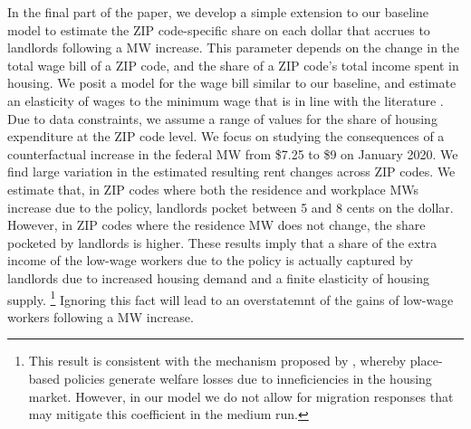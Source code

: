 In the final part of the paper, we develop a simple extension to our baseline 
model to estimate the ZIP code-specific share on each dollar that accrues to 
landlords following a MW increase.
This parameter depends on the change in the total wage bill of a ZIP code, and 
the share of a ZIP code's total income spent in housing.
We posit a model for the wage bill similar to our baseline, and estimate an 
elasticity of wages to the minimum wage that is in line with the literature
\parencite[e.g.,][]{CegnizEtAl2019}.
Due to data constraints, we assume a range of values for the share of housing
expenditure at the ZIP code level.
We focus on studying the consequences of a counterfactual increase in the federal 
MW from \$7.25 to \$9 on January 2020.
We find large variation in the estimated resulting rent changes across ZIP codes.
We estimate that, in ZIP codes where both the residence and workplace MWs increase
due to the policy, landlords pocket between 5 and 8 cents on the dollar.
However, in ZIP codes where the residence MW does not change, the share pocketed
by landlords is higher. 
These results imply that a share of the extra income of the low-wage workers
due to the policy is actually captured by landlords due to increased housing 
demand and a finite elasticity of housing supply.%
\footnote{This result is consistent with the mechanism proposed by 
\textcite{KlineMoretti2014}, whereby place-based policies generate welfare 
losses due to inneficiencies in the housing market.
However, in our model we do not allow for migration responses that may mitigate 
this coefficient in the medium run.}
Ignoring this fact will lead to an overstatemnt of the gains of low-wage workers
following a MW increase.


